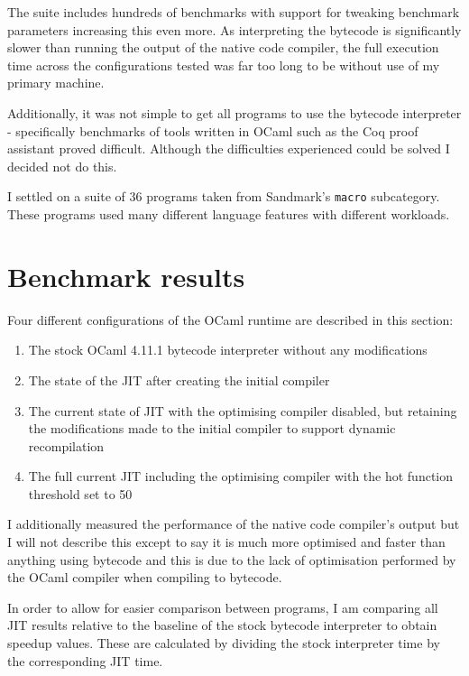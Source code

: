 The suite includes hundreds of benchmarks with support for tweaking benchmark parameters increasing
this even more. As interpreting the bytecode is significantly slower than running the output of the
native code compiler, the full execution time across the configurations tested was far too long to
be without use of my primary machine.

Additionally, it was not simple to get all programs to use the bytecode interpreter - specifically
benchmarks of tools written in OCaml such as the Coq proof assistant proved difficult. Although the
difficulties experienced could be solved I decided not do this.

I settled on a suite of 36 programs taken from Sandmark's \texttt{macro} subcategory. These
programs
used many different language features with different workloads.

\section{Benchmark results}

Four different configurations of the OCaml runtime are described in this section:

\begin{enumerate}
      \item The stock OCaml 4.11.1 bytecode interpreter without any modifications
      \item The state of the JIT after creating the initial compiler
      \item The current state of JIT with the optimising compiler disabled, but retaining
            the modifications made to the initial compiler to support dynamic recompilation
      \item The full current JIT including the optimising compiler with the hot function threshold
            set to 50
\end{enumerate}

I additionally measured the performance of the native code compiler's output but I will not
describe
this except to say it is much more optimised and faster than anything using bytecode and this is
due
to the lack of optimisation performed by the OCaml compiler when compiling to bytecode.

In order to allow for easier comparison between programs, I am comparing all JIT results relative
to
the baseline of the stock bytecode interpreter to obtain speedup values. These are calculated by
dividing the stock interpreter time by the corresponding JIT time.

